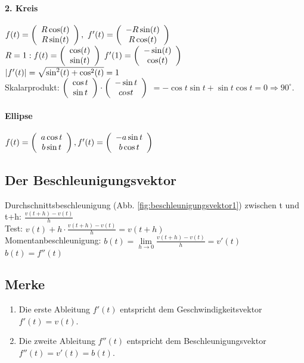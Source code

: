 \paragraph{2. Kreis} 
$ f(t) =   \left(  \begin{array}{c}  R \cos(t)\\ R\sin (t) \end{array}  \right)  , $
$f'(t) =   \left(  \begin{array}{c}  - R \sin(t)\\ R \cos(t) \end{array}  \right)  $\\
$R=1: f(t) =   \left(  \begin{array}{c}  \cos(t)\\ \sin (t) \end{array}  \right)   $
$f'(1) =   \left(  \begin{array}{c}  - \sin(t)\\ \cos(t) \end{array}  \right)  $ \\
$ \left\vert f'(t) \right\vert  = \sqrt{\sin^2 (t) + \cos^2(t)}=1 $\\
Skalarprodukt: 
$  \left(  \begin{array}{c}  \cos t\\\sin t \end{array}  \right)   \cdot   \left(  \begin{array}{c}  -\sin t\\ cos t \end{array}  \right)   $
$= -\cos t \sin t + \sin t \cos t = 0 \Rightarrow 90^\circ $.

\paragraph{Ellipse}
$ f(t)=  \left(  \begin{array}{c}  a \cos t\\ b \sin t  \end{array}  \right)  , f'(t)=  \left(  \begin{array}{c}  -a \sin t\\ b \cos t \end{array}  \right)  $

\subsection{Der Beschleunigungsvektor}
Durchschnittsbeschleunigung (Abb. \ref{fig:beschleunigungsvektor1}) zwischen t und t+h: 
$ \frac{v(t+h)-v(t)}{h}$\\
Test: $ v(t)+ h\cdot \frac{v(t+h)-v(t)}{h} = v(t+h)$\\
Momentanbeschleunigung: 
$ b(t)=\lim\limits_{h\rightarrow 0} \frac{v(t+h)-v(t)}{h} = v'(t)$\\
$ b(t)=f''(t)$

\subsection{Merke}
\begin{enumerate}
\item Die erste Ableitung $f'(t)$ entspricht dem Geschwindigkeitsvektor $f'(t) = v(t)$.
\item Die zweite Ableitung $f''(t)$ entspricht dem Beschleunigungsvektor $f''(t)= v'(t)=b(t)$.
\end{enumerate}

